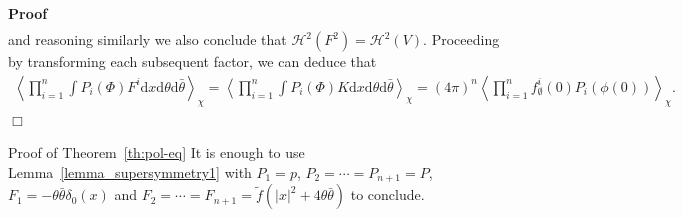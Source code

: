 \documentclass[a4paper,10pt]{article}
\newcommand{\mathd}{\mathrm{d}}
\newenvironment{proof}{\noindent\textbf{Proof\ }}{\hspace*{\fill}$\Box$\medskip}
\newenvironment{proof*}[1]{\noindent\textbf{#1\ }}{\hspace*{\fill}$\Box$\medskip}
\begin{document}
\begin{proof}
\begin{multline*}
  \end{multline*}
  and reasoning similarly we also conclude that $\mathcal{H}^2 (F^2)
  =\mathcal{H}^2 (V)$. Proceeding by transforming each subsequent factor, we
  can deduce that
  \begin{multline*}
    \left\langle \prod^n_{i = 1} \int P_i (\Phi) F^i \mathd x \mathd \theta
    \mathd \bar{\theta} \right\rangle_{\chi} = \left\langle \prod^n_{i = 1} \int P_i (\Phi) K \mathd x \mathd \theta
    \mathd \bar{\theta} \right\rangle_{\chi} = (4 \pi)^n \left\langle \prod_{i
    = 1}^n f^i_{\emptyset} (0) P_i (\phi (0)) \right\rangle_{\chi} .
  \end{multline*}
\end{proof}

\begin{proof*}{Proof of Theorem~\ref{th:pol-eq}}
  It is enough to use Lemma~\ref{lemma_supersymmetry1} with $P_1 = p$, $P_2 =
  \cdots = P_{n + 1} = P$, \ $F_1 = - \theta \bar{\theta} \delta_0 (x)$ and
  $F_2 = \cdots = F_{n + 1} = \tilde{f} (| x |^2 + 4 \theta \bar{\theta})$ to
  conclude.
\end{proof*}
\end{document}

